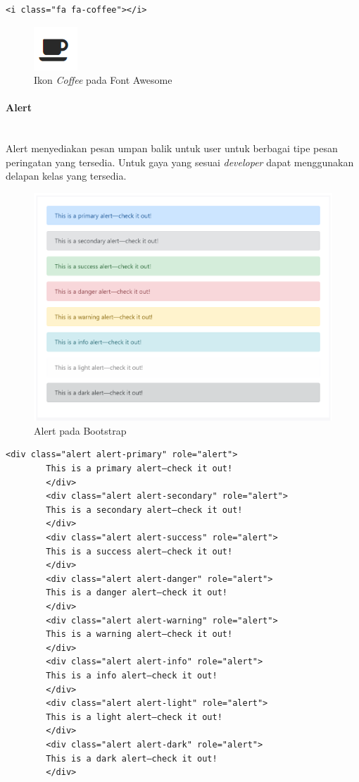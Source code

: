 \documentclass[a4paper,twoside]{article}
\newcommand{\myparagraph}[1]{\paragraph{#1}\mbox{}\\}
\begin{document}
\begin{enumerate}
		\begin{lstlisting}[frame=single]
		<i class="fa fa-coffee"></i>
		\end{lstlisting}
		
		\begin{figure} [H]
			\centering  
			\includegraphics[scale=1.0]{fa_coffee.PNG}  
			\caption{Ikon \textit{Coffee} pada Font Awesome} 
		\end{figure}
		\myparagraph{Alert}
		Alert menyediakan pesan umpan balik untuk user untuk berbagai tipe pesan peringatan yang tersedia. Untuk gaya yang sesuai \textit{developer} dapat menggunakan delapan kelas yang tersedia.
		\begin{figure} [H]
			\centering  
			\includegraphics[scale=1.0]{alert_bootstrap.PNG}  
			\caption{Alert pada Bootstrap} 
		\end{figure}
		\begin{lstlisting}[frame=single] 
		<div class="alert alert-primary" role="alert">
		This is a primary alert—check it out!
		</div>
		<div class="alert alert-secondary" role="alert">
		This is a secondary alert—check it out!
		</div>
		<div class="alert alert-success" role="alert">
		This is a success alert—check it out!
		</div>
		<div class="alert alert-danger" role="alert">
		This is a danger alert—check it out!
		</div>
		<div class="alert alert-warning" role="alert">
		This is a warning alert—check it out!
		</div>
		<div class="alert alert-info" role="alert">
		This is a info alert—check it out!
		</div>
		<div class="alert alert-light" role="alert">
		This is a light alert—check it out!
		</div>
		<div class="alert alert-dark" role="alert">
		This is a dark alert—check it out!
		</div>
		\end{lstlisting}
		

\end{enumerate}
\end{document}

